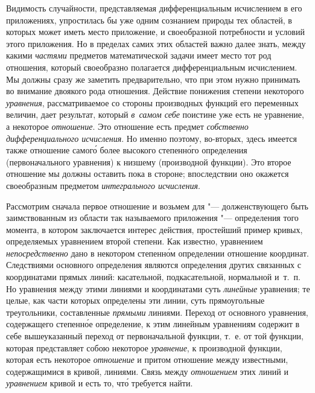 Видимость случайности, представляемая дифференциальным исчислением в его
приложениях, упростилась бы уже одним сознанием природы тех областей, в которых
может иметь место приложение, и своеобразной потребности и условий этого
приложения. Но в пределах самих этих областей важно далее знать, между какими
{\em частями} предметов математической задачи имеет место тот род отношения,
который своеобразно полагается дифференциальным исчислением. Мы должны сразу же
заметить предварительно, что при этом нужно принимать во внимание двоякого рода
отношения. Действие понижения степени некоторого {\em уравнения},
рассматриваемое со стороны производных функций его переменных величин, дает
результат, который {\em в~самом себе} поистине уже есть не уравнение,
а некоторое {\em отношение}. Это отношение есть предмет
{\em собственно дифференциального исчисления}. Но именно поэтому, во-вторых,
здесь имеется также отношение самог\'{о} более высокого степенн\'{о}го определения
(первоначального уравнения) к низшему (производной функции). Это второе
отношение мы должны оставить пока в стороне; впоследствии оно окажется
своеобразным предметом {\em интегрального исчисления}.

Рассмотрим сначала первое отношение и возьмем для "--- долженствующего быть
заимствованным из области так называемого приложения "--- определения того
момента, в котором заключается интерес действия, простейший пример кривых,
определяемых уравнением второй степени. Как известно, уравнением
{\em непосредственно} дано в некотором степенн\'{о}м определении отношение
координат. Следствиями основного определения являются определения других
связанных с координатами прямых линий: касательной, подкасательной, нормальной
и~т.~п. Но уравнения между этими линиями и координатами суть {\em линейные}
уравнения; те целые, как части которых определены эти линии, суть прямоугольные
треугольники, составленные {\em прямыми} линиями. Переход от основного
уравнения, содержащего степенн\'{о}е определение, к этим линейным уравнениям
содержит в себе вышеуказанный переход от первоначальной функции, т.~е. от той
функции, которая представляет собою некоторое {\em уравнение}, к производной
функции, которая есть некоторое {\em отношение} и притом отношение между
известными, содержащимися в кривой, линиями. Связь между {\em отношением} этих
линий и {\em уравнением} кривой и есть то, чт\'{о} требуется найти.

